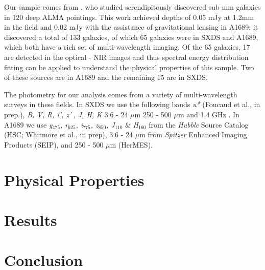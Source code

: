 \documentclass[preprint,natbib209]{aastex}
\begin{document}
Our sample comes from \cite{fujimoto15}, who studied serendipitously discovered sub-mm galaxies in 
120 deep ALMA pointings. This work achieved depths of 0.05 mJy at 1.2mm in the field and 0.02 mJy 
with the assistance of gravitational lensing in A1689; it discovered a total of 133 galaxies, of which 65 galaxies 
were in SXDS and A1689, which both have a rich set of multi-wavelength imaging. Of the 65 galaxies, 
17 are detected in the optical - NIR images and thus spectral energy distribution fitting can be applied to 
understand the physical properties of this sample. Two of these sources are in A1689 and the remaining
15 are in SXDS.

The photometry for our analysis comes from a variety of multi-wavelength surveys in these fields.
In SXDS we use the following bands \textit{u*} (Foucaud et al., in prep.), \textit{B, V, R, i', z'} \citep{furusawa08},
\textit{J, H, K} \citep[UKIDSS;\footnotemark][]{lawrence07} 3.6 - 24 $\mu$m \citep[SWIRE, SpUDS, SEDS;][]{lonsdale03, ashby13}
250 - 500 $\mu$m \citep[HerMES;][]{oliver12, smith12, wang14} and 1.4 GHz \citep{simpson06}.
In A1689 we use \textit{g$_{475}$, r$_{625}$, i$_{775}$, z$_{850}$, J$_{110}$} \& \textit{H}$_{160}$ from the \textit{Hubble} Source Catalog
(HSC; Whitmore et al., in prep), 3.6 - 24 $\mu$m from \textit{Spitzer} Enhanced Imaging Products (SEIP), and 250 - 500 $\mu$m (HerMES).


\section{Physical Properties}
\label{sec:analysis}



\section{Results}
\label{sec:discussion}



\section{Conclusion}
\label{sec:conclusion}
\end{document}

